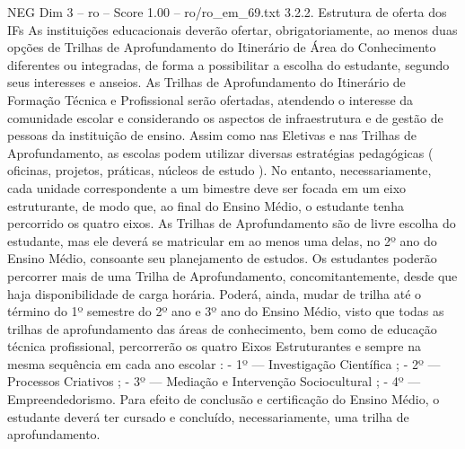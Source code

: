 \begin{textsample}{NEG Dim 3 – ro – Score 1.00 – ro/ro\_em\_69.txt}  \label{ex:f3_neg_159}
3.2.2.
Estrutura de oferta dos IFs As instituições educacionais deverão ofertar, obrigatoriamente, ao menos duas opções de Trilhas de Aprofundamento do Itinerário de Área do Conhecimento diferentes ou integradas, de forma a possibilitar a escolha do estudante, segundo seus interesses e anseios.
As Trilhas de Aprofundamento do Itinerário de Formação Técnica e Profissional serão ofertadas, atendendo o interesse da comunidade escolar e considerando os aspectos de infraestrutura e de gestão de pessoas da instituição de ensino.
Assim como nas Eletivas e nas Trilhas de Aprofundamento, as escolas podem utilizar diversas estratégias pedagógicas ( oficinas, projetos, práticas, núcleos de estudo ).
No entanto, necessariamente, cada unidade correspondente a um bimestre deve ser focada em um eixo estruturante, de modo que, ao final do Ensino Médio, o estudante tenha percorrido os quatro eixos.
As Trilhas de Aprofundamento são de livre escolha do estudante, mas ele deverá se matricular em ao menos uma delas, no 2º ano do Ensino Médio, consoante seu planejamento de estudos.
Os estudantes poderão percorrer mais de uma Trilha de Aprofundamento, concomitantemente, desde que haja disponibilidade de carga horária.
Poderá, ainda, mudar de trilha até o término do 1º semestre do 2º ano e 3º ano do Ensino Médio, visto que todas as trilhas de aprofundamento das áreas de conhecimento, bem como de educação técnica profissional, percorrerão os quatro Eixos Estruturantes e sempre na mesma sequência em cada ano escolar : - 1º — Investigação Científica ; - 2º — Processos Criativos ; - 3º — Mediação e Intervenção Sociocultural ; - 4º — Empreendedorismo.
Para efeito de conclusão e certificação do Ensino Médio, o estudante deverá ter cursado e concluído, necessariamente, uma trilha de aprofundamento.

\end{textsample}
